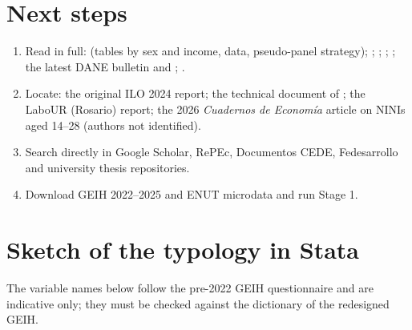 \documentclass[11pt]{article}
\begin{document}
\section{Next steps}

\begin{enumerate}
\item Read in full: \citet{lasso2026} (tables by sex and income, data, pseudo-panel strategy); \citet{sanchez2021}; \citet{lopez2020}; \citet{lee99}; \citet{icbf}; the latest DANE bulletin and \citet{dane2021}; \citet{aguero}.
\item Locate: the original ILO 2024 report; the technical document of \citet{bernal2019}; the LaboUR (Rosario) report; the 2026 \textit{Cuadernos de Econom\'ia} article on NINIs aged 14--28 (authors not identified).
\item Search directly in Google Scholar, RePEc, Documentos CEDE, Fedesarrollo and university thesis repositories.
\item Download GEIH 2022--2025 and ENUT microdata and run Stage 1.
\end{enumerate}

\appendix
\section{Sketch of the typology in Stata}

The variable names below follow the pre-2022 GEIH questionnaire and are indicative only; they must be checked against the dictionary of the redesigned GEIH.
\end{document}

